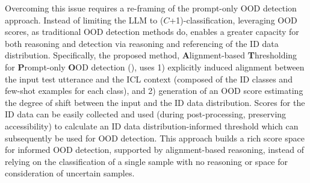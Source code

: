 Overcoming this issue requires a re-framing of the prompt-only OOD detection approach. Instead of limiting the LLM to ($C$+1)-classification, leveraging OOD scores, as traditional OOD detection methods do, enables a greater capacity for both reasoning and detection via reasoning and referencing of the ID data distribution. Specifically, the proposed method, \textbf{A}lignment-based \textbf{T}hresholding for \textbf{P}rompt-only \textbf{O}OD detection (\syst), uses 1) explicitly induced alignment between the input test utterance and the ICL context (composed of the ID classes and few-shot examples for each class), and 2) generation of an OOD score estimating the degree of shift between the input and the ID data distribution. Scores for the ID data can be easily collected and used (during post-processing, preserving accessibility) to calculate an ID data distribution-informed threshold which can subsequently be used for OOD detection. This approach builds a rich score space for informed OOD detection, supported by alignment-based reasoning, instead of relying on the classification of a single sample with no reasoning or space for consideration of uncertain samples.

